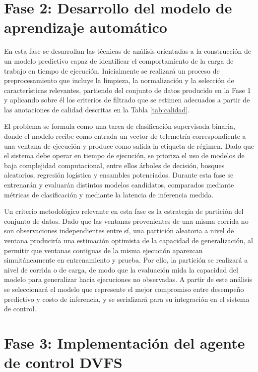 \documentclass[12pt,oneside,spanish]{book}
\begin{document}
\section{Fase 2: Desarrollo del modelo de aprendizaje automático}

En esta fase se desarrollan las técnicas de análisis orientadas a la construcción de un modelo predictivo capaz de identificar el comportamiento de la carga de trabajo en tiempo de ejecución. Inicialmente se realizará un proceso de preprocesamiento que incluye la limpieza, la normalización y la selección de características relevantes, partiendo del conjunto de datos producido en la Fase 1 y aplicando sobre él los criterios de filtrado que se estimen adecuados a partir de las anotaciones de calidad descritas en la Tabla \ref{tab:calidad}.

El problema se formula como una tarea de clasificación supervisada binaria, donde el modelo recibe como entrada un vector de telemetría correspondiente a una ventana de ejecución y produce como salida la etiqueta de régimen. Dado que el sistema debe operar en tiempo de ejecución, se prioriza el uso de modelos de baja complejidad computacional, entre ellos árboles de decisión, bosques aleatorios, regresión logística y ensambles potenciados. Durante esta fase se entrenarán y evaluarán distintos modelos candidatos, comparados mediante métricas de clasificación y mediante la latencia de inferencia medida.

Un criterio metodológico relevante en esta fase es la estrategia de partición del conjunto de datos. Dado que las ventanas provenientes de una misma corrida no son observaciones independientes entre sí, una partición aleatoria a nivel de ventana produciría una estimación optimista de la capacidad de generalización, al permitir que ventanas contiguas de la misma ejecución aparezcan simultáneamente en entrenamiento y prueba. Por ello, la partición se realizará a nivel de corrida o de carga, de modo que la evaluación mida la capacidad del modelo para generalizar hacia ejecuciones no observadas. A partir de este análisis se seleccionará el modelo que represente el mejor compromiso entre desempeño predictivo y costo de inferencia, y se serializará para su integración en el sistema de control.

\section{Fase 3: Implementación del agente de control DVFS}
\end{document}
